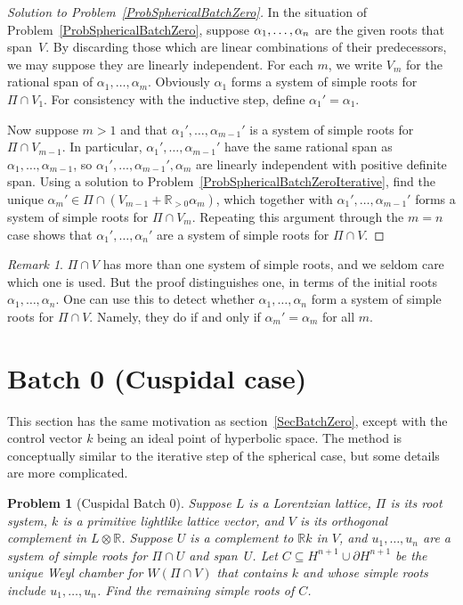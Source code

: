 \documentclass[12pt]{amsart}
\def\R{\mathbb{R}}
\def\tensor{\otimes}
\def\sset{\subseteq}
\numberwithin{theorem}{section}
\numberwithin{equation}{section}
\numberwithin{figure}{section}
\newtheorem{problem}[theorem]{Problem}
\theoremstyle{remark}
\newtheorem{remark}[theorem]{Remark}
\begin{document}
\begin{proof}[Solution to Problem~\ref{ProbSphericalBatchZero}]
In the
    situation of Problem~\ref{ProbSphericalBatchZero}, suppose $\alpha_1,\discretionary{}{}{}\dots,\discretionary{}{}{}\alpha_n$ are the given roots that span~$V$.
By discarding those which are linear combinations of their predecessors, 
we may suppose they are linearly independent.  For each $m$, we write $V_m$ for the
rational span of $\alpha_1,\dots,\alpha_m$.  Obviously $\alpha_1$ forms a system of simple roots
for $\Pi\cap V_1$.  For consistency with the inductive step, define $\alpha_1'=\alpha_1$.

    Now suppose $m>1$ and that $\alpha_1',\dots,\alpha_{m-1}'$ is a system of simple roots for 
    $\Pi\cap V_{m-1}$.  In particular, $\alpha_1',\dots,\alpha_{m-1}'$ have the same rational span
    as $\alpha_1,\dots,\alpha_{m-1}$, so $\alpha_1',\dots,\alpha_{m-1}',\alpha_m$ are linearly independent with
    positive definite span.  Using a solution to Problem~\ref{ProbSphericalBatchZeroIterative}, find
    the unique $\alpha_m'\in\Pi\cap(V_{m-1}+\R_{>0}\alpha_m)$, which together with $\alpha_1',\dots,\alpha_{m-1}'$
    forms a system of simple roots for $\Pi\cap V_m$.  Repeating this argument through the $m=n$
    case shows that $\alpha_1',\dots,\alpha_n'$ are a system of simple roots for $\Pi\cap V$.
\end{proof}

\begin{remark}
$\Pi\cap V$ has more than one system of simple roots, and  we seldom care
which one is used.  But the proof distinguishes  one, in 
    terms of the initial roots $\alpha_1,\dots,\alpha_n$.  One can use this to detect
    whether $\alpha_1,\dots,\alpha_n$ form a system of simple roots for $\Pi\cap V$. 
    Namely,
    they do if and only if $\alpha_m'=\alpha_m$ for all $m$.
\end{remark}

\section{Batch 0 (Cuspidal case)}
\label{SecCuspidalBatch0}

\noindent
This section has the same motivation as section~\ref{SecBatchZero}, except with
the control vector $k$ being an ideal point of hyperbolic space.
The method is conceptually similar to the iterative step of the spherical
case, but some details are more complicated. 

\begin{problem}[Cuspidal Batch 0]
    \label{ProbCuspidalBatch0}
    Suppose $L$ is a Lorentzian lattice, $\Pi$ is its root system,
    $k$ is a primitive
    lightlike lattice vector, and $V$ is its orthogonal complement
    in $L\tensor\R$.  
    Suppose $U$ is a complement to $\R k$ in $V$,
    and $u_1,\dots,u_n$ are a system of simple roots for $\Pi\cap U$ and span~$U$.
    Let $C\sset H^{n+1}\cup\partial H^{n+1}$ be the unique Weyl chamber 
    for $W(\Pi\cap V)$ that contains $k$ and whose simple roots include
    $u_1,\dots,u_n$.  Find the remaining simple roots of $C$.
\end{problem}
\end{document}
